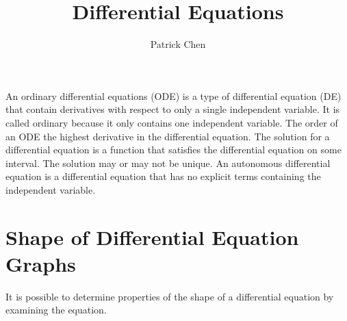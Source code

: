 \documentclass{article}
\title{Differential Equations}
\author{Patrick Chen}
\theoremstyle{mytheoremstyle}
\theoremstyle{mytheoremstyle}
\theoremstyle{myproblemstyle}
\begin{document}
    \maketitle
    An ordinary differential equations (ODE) is a type of differential equation
    (DE) that contain derivatives with respect to only a single independent
    variable. It is called ordinary because it only contains one independent
    variable. The order of an ODE the highest derivative in the differential
    equation. The solution for a differential equation is a function that
    satisfies the differential equation on some interval. The solution may or
    may not be unique. An autonomous differential equation is a differential
    equation that has no explicit terms containing the independent variable.

    \section*{Shape of Differential Equation Graphs}
    It is possible to determine properties of the shape of a differential
    equation by examining the equation.
\end{document}
